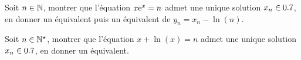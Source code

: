 \begin{exercice}    
    Soit $n \in \mathbb{N}$, montrer que l'équation $x \mathrm{e}^x = n$ admet une unique solution $x_n \in 0.7$, en donner un équivalent puis un équivalent de $y_n = x_n - \ln(n)$.  
\end{exercice}

\begin{exercice}
    Soit $n \in \mathbb{N}^\star$, montrer que l'équation $x + \ln(x) = n$ admet une unique solution $x_n \in 0.7$, en donner un équivalent.
\end{exercice}
    
